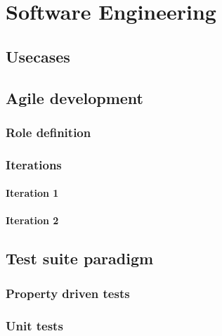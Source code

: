 \chapter{Software Engineering}
  \section{Usecases}
  \section{Agile development}
    \subsection{Role definition}
    \subsection{Iterations}
      \subsubsection{Iteration 1}
      \subsubsection{Iteration 2}
  \section{Test suite paradigm}
    \subsection{Property driven tests}
    \subsection{Unit tests}
